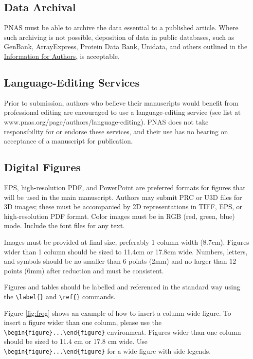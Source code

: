 \documentclass[9pt,twocolumn,twoside,lineno]{pnas-new}
\begin{document}
\subsection*{Data Archival}

PNAS must be able to archive the data essential to a published article. Where such archiving is not possible, deposition of data in public databases, such as GenBank, ArrayExpress, Protein Data Bank, Unidata, and others outlined in the \href{https://www.pnas.org/page/authors/journal-policies#xi}{Information for Authors}, is acceptable.

\subsection*{Language-Editing Services}
Prior to submission, authors who believe their manuscripts would benefit from professional editing are encouraged to use a language-editing service (see list at www.pnas.org/page/authors/language-editing). PNAS does not take responsibility for or endorse these services, and their use has no bearing on acceptance of a manuscript for publication. 

\subsection*{Digital Figures}

EPS, high-resolution PDF, and PowerPoint are preferred formats for figures that will be used in the main manuscript. Authors may submit PRC or U3D files for 3D images; these must be accompanied by 2D representations in TIFF, EPS, or high-resolution PDF format. Color images must be in RGB (red, green, blue) mode. Include the font files for any text.

Images must be provided at final size, preferably 1 column width (8.7cm). Figures wider than 1 column should be sized to 11.4cm or 17.8cm wide. Numbers, letters, and symbols should be no smaller than 6 points (2mm) and no larger than 12 points (6mm) after reduction and must be consistent. 

Figures and tables should be labelled and referenced in the standard way using the \verb|\label{}| and \verb|\ref{}| commands.

Figure \ref{fig:frog} shows an example of how to insert a column-wide figure. To insert a figure wider than one column, please use the \verb|\begin{figure}...\end{figure}| environment. Figures wider than one column should be sized to 11.4 cm or 17.8 cm wide. Use \verb|\begin{figure}...\end{figure}| for a wide figure with side legends.
\end{document}
